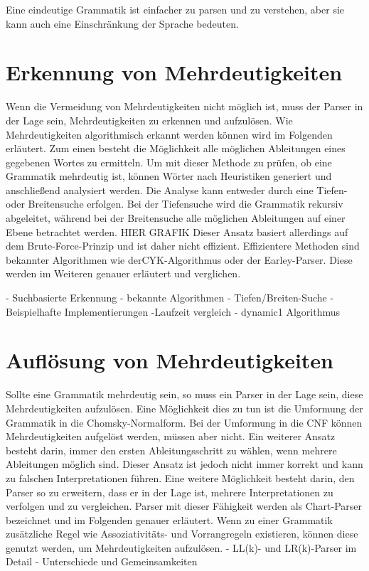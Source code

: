 \documentclass[runningheads]{llncs}
\begin{document}
	Eine eindeutige Grammatik ist einfacher zu parsen und zu verstehen,
	aber sie kann auch eine Einschränkung der Sprache bedeuten.


	\section{Erkennung von Mehrdeutigkeiten}

	Wenn die Vermeidung von Mehrdeutigkeiten nicht möglich ist,
	muss der Parser in der Lage sein, Mehrdeutigkeiten zu erkennen und aufzulösen.
	Wie Mehrdeutigkeiten algorithmisch erkannt werden können wird im Folgenden erläutert.
	Zum einen besteht die Möglichkeit alle möglichen Ableitungen eines gegebenen Wortes zu ermitteln.
	Um mit dieser Methode zu prüfen, ob eine Grammatik mehrdeutig ist,
	können Wörter nach Heuristiken generiert und anschließend analysiert werden.
	Die Analyse kann entweder durch eine Tiefen- oder Breitensuche erfolgen.
	Bei der Tiefensuche wird die Grammatik rekursiv abgeleitet,
	während bei der Breitensuche alle möglichen Ableitungen auf einer Ebene betrachtet werden.
	HIER GRAFIK
	Dieser Ansatz basiert allerdings auf dem Brute-Force-Prinzip und ist daher nicht effizient.
	Effizientere Methoden sind bekannter Algorithmen wie derCYK-Algorithmus oder der Earley-Parser.
	Diese werden im Weiteren genauer erläutert und verglichen.

	- Suchbasierte Erkennung
	- bekannte Algorithmen
	- Tiefen/Breiten-Suche
	- Beispielhafte Implementierungen
	-Laufzeit vergleich
	- dynamic1 Algorithmus


	\section{Auflösung von Mehrdeutigkeiten}

	Sollte eine Grammatik mehrdeutig sein, so muss ein Parser in der Lage sein, diese Mehrdeutigkeiten aufzulösen.
	Eine Möglichkeit dies zu tun ist die Umformung der Grammatik in die Chomsky-Normalform.
	Bei der Umformung in die CNF können Mehrdeutigkeiten aufgelöst werden, müssen aber nicht.
	Ein weiterer Ansatz besteht darin, immer den ersten Ableitungsschritt zu wählen, wenn mehrere Ableitungen möglich sind.
	Dieser Ansatz ist jedoch nicht immer korrekt und kann zu falschen Interpretationen führen.
	Eine weitere Möglichkeit besteht darin, den Parser so zu erweitern,
	dass er in der Lage ist, mehrere Interpretationen zu verfolgen und zu vergleichen.
	Parser mit dieser Fähigkeit werden als Chart-Parser bezeichnet und im Folgenden genauer erläutert.
	Wenn zu einer Grammatik zusätzliche Regel wie Assoziativitäts- und Vorrangregeln existieren,
	können diese genutzt werden, um Mehrdeutigkeiten aufzulösen. \cite{springer2013}
	- LL(k)- und LR(k)-Parser im Detail
	- Unterschiede und Gemeinsamkeiten
\end{document}

